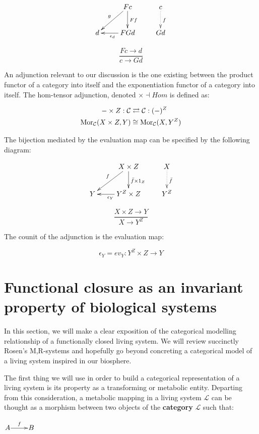 \documentclass[aps,twocolumn]{revtex4-1}
\begin{document}
$$
			\xymatrix{
			& F c \ar[d]^{F f} \ar[dl]_{g} & c \ar@{.>}[d]^{f}\\
			d & F G d \ar[l]^{\epsilon_d} & G d}
$$

		$$
			\frac{Fc \longrightarrow d}{c \longrightarrow Gd}
		$$
		
An adjunction relevant to our discussion is the one existing between the product functor of a category into itself and the exponentiation functor of a category into itself. The hom-tensor adjunction, denoted $\times \dashv Hom$ is defined as:
		
		\begin{align*}
- \times Z: \mathcal{C} & \rightleftarrows \mathcal{C}: (-)^Z\\
\mathop{\rm Mor}\nolimits_{\mathcal{C}}(X \times Z, Y) & \cong  \mathop{\rm Mor}\nolimits_{\mathcal{C}}(X, Y^Z)
\end{align*}

The bijection mediated by the evaluation map can be specified by the following diagram:

			$$
			\xymatrix{
			& X \times Z \ar[d]^{\bar{f} \times 1_Z} \ar[dl]_{f} & X \ar@{.>}[d]^{\bar{f}}\\
			Y & Y^Z \times Z \ar[l]^{\epsilon_Y} & Y^Z}
			$$

		$$
			\frac{X \times Z \longrightarrow Y}{X \longrightarrow Y^Z}
		$$
		
The counit of the adjunction is the evaluation map:

		$$
			\epsilon_Y = ev_Y \colon Y^Z \times Z \longrightarrow Y
		$$
	
	
\section{Functional closure as an invariant property of biological systems}

In this section, we will make a clear exposition of the categorical modelling relationship of a functionally closed living system. We will review succinctly Rosen's M,R-systems and hopefully go beyond concreting a categorical model of a living system inspired in our biosphere.

The first thing we will use in order to build a categorical representation of a living system is its property as a transforming or metabolic entity. Departing from this consideration, a metabolic mapping in a living system $\mathcal{L}$ can be thought as a morphism between two objects of the \textbf{category} $\mathcal{L}$ such that:

\begin{center}
	$\xymatrix@1{
	A\ar[r]^-{f} & B
	}$

\end{center}
\end{document}
